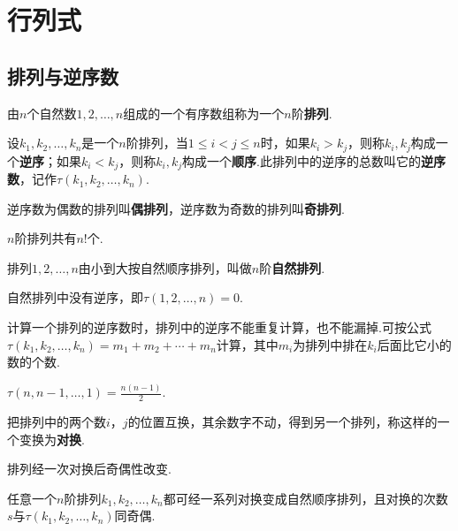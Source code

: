 \chapter{行列式}
\section{排列与逆序数}
\begin{definition}
由\(n\)个自然数\(1,2,\dotsc,n\)组成的一个有序数组称为一个\(n\)阶\textbf{排列}.

设\(k_1,k_2,\dotsc,k_n\)是一个\(n\)阶排列，当\(1 \leqslant i<j \leqslant n\)时，如果\(k_i>k_j\)，则称\(k_i,k_j\)构成一个\textbf{逆序}；如果\(k_i<k_j\)，则称\(k_i,k_j\)构成一个\textbf{顺序}.此排列中的逆序的总数叫它的\textbf{逆序数}，记作\(\tau(k_1,k_2,\dotsc,k_n)\).

逆序数为偶数的排列叫\textbf{偶排列}，逆序数为奇数的排列叫\textbf{奇排列}.
\end{definition}

\begin{property}
\(n\)阶排列共有\(n!\)个.
\end{property}

\begin{definition}
排列\(1,2,\dotsc,n\)由小到大按自然顺序排列，叫做\(n\)阶\textbf{自然排列}.
\end{definition}

\begin{property}
自然排列中没有逆序，即\(\tau(1,2,\dotsc,n)=0\).
\end{property}

\begin{theorem}
计算一个排列的逆序数时，排列中的逆序不能重复计算，也不能漏掉.可按公式\(\tau(k_1,k_2,\dotsc,k_n)=m_1+m_2+\dotsb+m_n\)计算，其中\(m_i\)为排列中排在\(k_i\)后面比它小的数的个数.
\end{theorem}

\begin{property}
\(\tau(n,n-1,\dotsc,1)=\frac{n(n-1)}{2}\).
\end{property}

\begin{definition}
把排列中的两个数\(i\)，\(j\)的位置互换，其余数字不动，得到另一个排列，称这样的一个变换为\textbf{对换}.
\end{definition}

\begin{theorem}
排列经一次对换后奇偶性改变.
\end{theorem}

\begin{theorem}
任意一个\(n\)阶排列\(k_1,k_2,\dotsc,k_n\)都可经一系列对换变成自然顺序排列，且对换的次数\(s\)与\(\tau(k_1,k_2,\dotsc,k_n)\)同奇偶.
\end{theorem}

